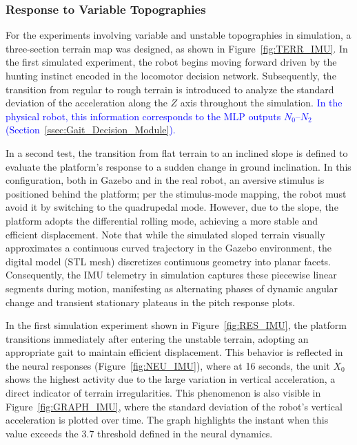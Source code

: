 \documentclass[preprint,12pt]{elsarticle}
\newcommand{\revblue}[1]{\textcolor{blue}{#1}}
\begin{document}
\subsubsection{Response to Variable Topographies}

For the experiments involving variable and unstable topographies in simulation, a three-section terrain map was designed, as shown in Figure~\ref{fig:TERR_IMU}. In the first simulated experiment, the robot begins moving forward driven by the hunting instinct encoded in the locomotor decision network. Subsequently, the transition from regular to rough terrain is introduced to analyze the standard deviation of the acceleration along the $Z$ axis throughout the simulation. \revblue{In the physical robot, this information corresponds to the MLP outputs $N_0$--$N_2$ (Section~\ref{ssec:Gait_Decision_Module}).} 

In a second test, the transition from flat terrain to an inclined slope is defined to evaluate the platform's response to a sudden change in ground inclination. In this configuration, both in Gazebo and in the real robot, an aversive stimulus is positioned behind the platform; per the stimulus-mode mapping, the robot must avoid it by switching to the quadrupedal mode. However, due to the slope, the platform adopts the differential rolling mode, achieving a more stable and efficient displacement. Note that while the simulated sloped terrain visually approximates a continuous curved trajectory in the Gazebo environment, the digital model (STL mesh) discretizes continuous geometry into planar facets. Consequently, the IMU telemetry in simulation captures these piecewise linear segments during motion, manifesting as alternating phases of dynamic angular change and transient stationary plateaus in the pitch response plots.

In the first simulation experiment shown in Figure~\ref{fig:RES_IMU}, the platform transitions immediately after entering the unstable terrain, adopting an appropriate gait to maintain efficient displacement. This behavior is reflected in the neural responses (Figure~\ref{fig:NEU_IMU}), where at 16 seconds, the unit $X_{0}$ shows the highest activity due to the large variation in vertical acceleration, a direct indicator of terrain irregularities. This phenomenon is also visible in Figure~\ref{fig:GRAPH_IMU}, where the standard deviation of the robot's vertical acceleration is plotted over time. The graph highlights the instant when this value exceeds the 3.7 threshold defined in the neural dynamics.
\end{document}
